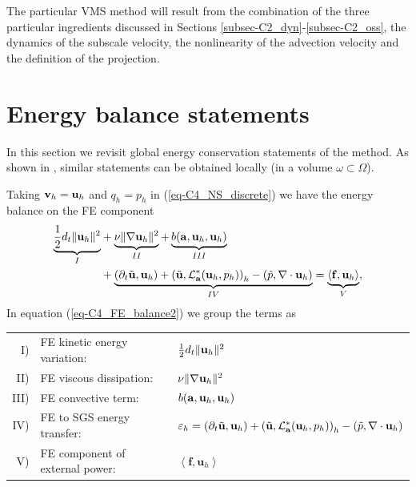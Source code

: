 The particular VMS method will result from the combination of the three particular ingredients discussed in Sections \ref{subsec-C2_dyn}-\ref{subsec-C2_oss}, the dynamics of the subscale velocity, the nonlinearity of the advection velocity and the definition of the projection.

\section{Energy balance statements}
\label{sec-C4_energy}

In this section we revisit global energy conservation statements of the method. As shown in \cite{principe_dissipative_2010}, similar statements can be obtained locally (in a volume $\omega \subset \Omega$).

Taking ${\bf v}_h={\bf u}_h$ and $q_h=p_h$ in (\ref{eq-C4_NS_discrete}) we have the energy balance on the FE component
\begin{align}
\label{eq-C4_FE_balance2}
\underbrace{\frac{1}{2}d_t\|{\bf u}_h\|^2}_I
& +\underbrace{\nu\|\nabla{\bf u}_h\|^2}_{II}
  +\underbrace{b({\bf a},{\bf u}_h,{\bf u}_h)}_{III} \\ \nonumber
& +\underbrace{(\partial_t\tilde{{\bf u}},{\bf u}_h)
+\left(\tilde{{\bf u}},\mathcal{L}^*_{{\bf a}}({\bf u}_h,p_h)\right)_h
-\left(\tilde{p},\nabla\cdot{\bf u}_h\right)}_{IV}
=\underbrace{\left<\mathbf{f},\mathbf{u}_h\right>}_V,
\end{align}
In equation (\ref{eq-C4_FE_balance2}) we group the terms as
\begin{center}
\begin{tabular}{rll}
I)&FE kinetic energy variation:&$\frac{1}{2}d_t\|{\bf u}_h\|^2$\\
II)&FE viscous dissipation:&$\nu\|\nabla{\bf u}_h\|^2$\\
III)&FE convective term:&$b({\bf a},{\bf u}_h,{\bf u}_h)$\\
IV)&FE to SGS energy transfer:&$\varepsilon_{h} =(\partial_t\tilde{{\bf u}},{\bf u}_h)+\left(\tilde{{\bf u}},\mathcal{L}^*_{{\bf a}}({\bf u}_h,p_h)\right)_h-\left(\tilde{p},\nabla\cdot{\bf u}_h\right)$\\
V)&FE component of external power:& $\left<\mathbf{f},\mathbf{u}_h\right>$\\
\end{tabular}
\end{center}

